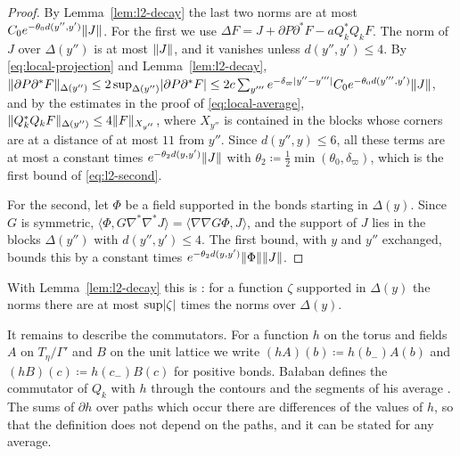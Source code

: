 \documentclass[11pt]{preprint}
\DeclarePairedDelimiter{\abs}{\lvert}{\rvert}
\DeclarePairedDelimiter{\norm}{\lVert}{\rVert}
\numberwithin{equation}{section}
\theoremstyle{definition}
\theoremstyle{remark}
\theoremstyle{plain}
\begin{document}
\begin{proof}
By Lemma~\ref{lem:l2-decay} the last two norms are at most $C_0e^{-\theta_0d(y'', y')}\norm{J}$. For the first we use $\Delta F = J + \partial P\partial^*F - aQ_k^*Q_kF$. The norm of $J$ over $\Delta(y'')$ is at most $\norm J$, and it vanishes unless $d(y'', y') \leq 4$. By \eqref{eq:local-projection} and Lemma~\ref{lem:l2-decay}, $\norm{\partial P\partial^*F}_{\Delta(y'')} \leq 2\sup_{\Delta(y'')}\abs{\partial P\partial^*F} \leq 2c\sum_{y'''}e^{-\delta_\varpi\abs{y'' - y'''}}C_0e^{-\theta_0d(y''', y')}\norm{J}$, and by the estimates in the proof of \eqref{eq:local-average}, $\norm{Q_k^*Q_kF}_{\Delta(y'')} \leq 4\norm{F}_{X_{y''}}$, where $X_{y''}$ is contained in the blocks whose corners are at a distance of at most $11$ from $y''$. Since $d(y'', y) \leq 6$, all these terms are at most a constant times $e^{-\theta_2d(y, y')}\norm{J}$ with $\theta_2 \coloneqq \frac12\min(\theta_0, \delta_\varpi)$, which is the first bound of \eqref{eq:l2-second}.

For the second, let $\Phi$ be a field supported in the bonds starting in $\Delta(y)$. Since $G$ is symmetric, $\langle\Phi, G\nabla^*\nabla^*J\rangle = \langle\nabla\nabla G\Phi, J\rangle$, and the support of $J$ lies in the blocks $\Delta(y'')$ with $d(y'', y') \leq 4$. The first bound, with $y$ and $y''$ exchanged, bounds this by a constant times $e^{-\theta_2d(y, y')}\norm\Phi\norm{J}$.
\end{proof}

With Lemma~\ref{lem:l2-decay} this is \cite[(1.114)]{BalabanPRT1}: for a function $\zeta$ supported in $\Delta(y)$ the norms there are at most $\sup\abs\zeta$ times the norms over $\Delta(y)$.

It remains to describe the commutators. For a function $h$ on the torus and fields $A$ on $T_\eta/\Gamma'$ and $B$ on the unit lattice we write $(hA)(b) \coloneqq h(b_-)A(b)$ and $(hB)(c) \coloneqq h(c_-)B(c)$ for positive bonds. Ba{\l}aban defines the commutator of $Q_k$ with $h$ through the contours and the segments of his average \cite[(1.120)]{BalabanPRT1}. The sums of $\partial h$ over paths which occur there are differences of the values of $h$, so that the definition does not depend on the paths, and it can be stated for any average.
\end{document}
